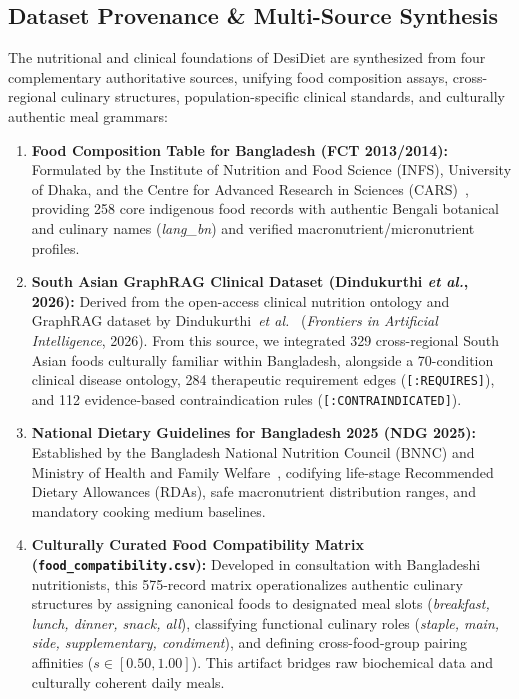 \documentclass[5p,times,twocolumn]{elsarticle}
\makeatletter
\def\systemname{DesiDiet}%
\def\my@bx{bx}
\def\my@b{b}
\DeclareRobustCommand{\systemname}{%
  \texorpdfstring{%
    \ifx\f@series\my@bx
      DesiDiet%
    \else\ifx\f@series\my@b
      DesiDiet%
    \else
      \textsc{DesiDiet}%
    \fi\fi
  }{DesiDiet}%
}
\newcommand{\etal}{\textit{et al.}}
\makeatother
\begin{document}
\subsection{Dataset Provenance \& Multi-Source Synthesis}
\label{sec:data_sources}
The nutritional and clinical foundations of \systemname{} are synthesized from four complementary authoritative sources, unifying food composition assays, cross-regional culinary structures, population-specific clinical standards, and culturally authentic meal grammars:
\begin{enumerate}[leftmargin=*,itemsep=1.5pt]
  \item \textbf{Food Composition Table for Bangladesh (FCT 2013/2014):} Formulated by the Institute of Nutrition and Food Science (INFS), University of Dhaka, and the Centre for Advanced Research in Sciences (CARS)~\cite{bdfct2014}, providing 258 core indigenous food records with authentic Bengali botanical and culinary names (\textit{lang\_bn}) and verified macronutrient/micronutrient profiles.
  \item \textbf{South Asian GraphRAG Clinical Dataset (Dindukurthi \etal{}, 2026):} Derived from the open-access clinical nutrition ontology and GraphRAG dataset by Dindukurthi~\etal{}~\cite{dindukurthi2026graphrag} (\textit{Frontiers in Artificial Intelligence}, 2026). From this source, we integrated 329 cross-regional South Asian foods culturally familiar within Bangladesh, alongside a 70-condition clinical disease ontology, 284 therapeutic requirement edges (\texttt{[:REQUIRES]}), and 112 evidence-based contraindication rules (\texttt{[:CONTRAINDICATED]}).
  \item \textbf{National Dietary Guidelines for Bangladesh 2025 (NDG 2025):} Established by the Bangladesh National Nutrition Council (BNNC) and Ministry of Health and Family Welfare~\cite{bdnac2023}, codifying life-stage Recommended Dietary Allowances (RDAs), safe macronutrient distribution ranges, and mandatory cooking medium baselines.
  \item \textbf{Culturally Curated Food Compatibility Matrix (\texttt{food\_compatibility.csv}):} Developed in consultation with Bangladeshi nutritionists, this 575-record matrix operationalizes authentic culinary structures by assigning canonical foods to designated meal slots (\textit{breakfast, lunch, dinner, snack, all}), classifying functional culinary roles (\textit{staple, main, side, supplementary, condiment}), and defining cross-food-group pairing affinities ($s \in [0.50, 1.00]$). This artifact bridges raw biochemical data and culturally coherent daily meals.
\end{enumerate}
\end{document}
